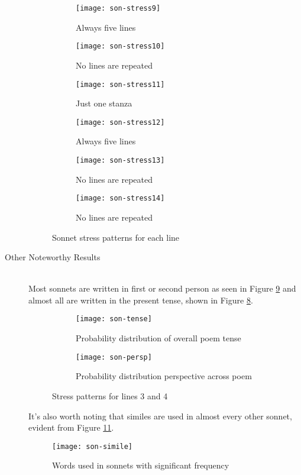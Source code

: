 \begin{description}
\begin{figure}[H]
\begin{subfigure}[t]{0.5\textwidth}
	\centering
    \texttt{[image: son-stress9]}
    \caption{Always five lines}
    \label{fig:son-stress9}
\end{subfigure}
\begin{subfigure}[t]{0.5\textwidth}
	\centering
    \texttt{[image: son-stress10]}
    \caption{No lines are repeated}
    \label{fig:son-stress10}
\end{subfigure}
\begin{subfigure}[t]{0.5\textwidth}
	\centering
    \texttt{[image: son-stress11]}
    \caption{Just one stanza}
    \label{fig:son-stress11}
\end{subfigure}
\begin{subfigure}[t]{0.5\textwidth}
	\centering
    \texttt{[image: son-stress12]}
    \caption{Always five lines}
    \label{fig:son-stress12}
\end{subfigure}
\begin{subfigure}[t]{0.5\textwidth}
	\centering
    \texttt{[image: son-stress13]}
    \caption{No lines are repeated}
    \label{fig:son-stress13}
\end{subfigure}
\begin{subfigure}[t]{0.5\textwidth}
	\centering
    \texttt{[image: son-stress14]}
    \caption{No lines are repeated}
    \label{fig:son-stress14}
\end{subfigure}
\caption{Sonnet stress patterns for each line}
\label{fig:son4}
\end{figure}

\item[Other Noteworthy Results]  \hfill \\
Most sonnets are written in first or second person as seen in Figure \ref{fig:son-persp} and almost all are written in the present tense, shown in Figure \ref{fig:son-tense}.

\begin{figure}[H]
\centering
\begin{subfigure}[t]{0.5\textwidth}
	\centering
    \texttt{[image: son-tense]}
    \caption{Probability distribution of overall poem tense}
    \label{fig:son-tense}
\end{subfigure}
\begin{subfigure}[t]{0.5\textwidth}
	\centering
    \texttt{[image: son-persp]}
    \caption{Probability distribution perspective across poem}
    \label{fig:son-persp}
\end{subfigure}
\caption{Stress patterns for lines 3 and 4}
\label{fig:son5}
\end{figure}

It's also worth noting that similes are used in almost every other sonnet, evident from Figure \ref{fig:son-simile}.

\begin{figure}[H]
\centering
\texttt{[image: son-simile]}
\caption{Words used in sonnets with significant frequency}
\label{fig:son-simile}
\end{figure}

\end{description}

